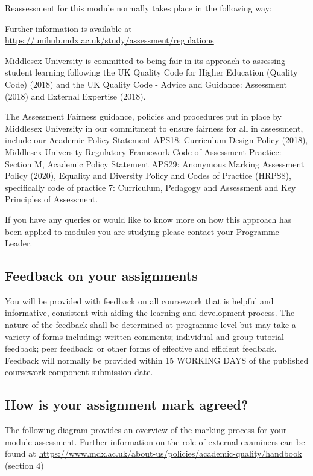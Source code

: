 \documentclass{MDXHandbook}
\begin{document}
Reassessment for this module normally takes place in the following way:

Further information is available at \\ \url{https://unihub.mdx.ac.uk/study/assessment/regulations}

Middlesex University is committed to being fair in its approach to assessing student learning following the UK Quality Code for Higher Education (Quality Code) (2018) and the UK Quality Code - Advice and Guidance: Assessment (2018) and External Expertise (2018).

The Assessment Fairness guidance, policies and procedures put in place by Middlesex University in our commitment to ensure fairness for all in assessment, include our Academic Policy Statement APS18: Curriculum Design Policy (2018), Middlesex University Regulatory Framework Code of Assessment Practice: Section M, Academic Policy Statement APS29: Anonymous Marking Assessment Policy (2020), Equality and Diversity Policy and Codes of Practice (HRPS8), specifically code of practice 7: Curriculum, Pedagogy and Assessment and Key Principles of Assessment. 

If you have any queries or would like to know more on how this approach has been applied to modules you are studying please contact your Programme Leader.

\subsection{Feedback on your assignments}
You will be provided with feedback on all coursework that is helpful and informative, consistent with aiding the learning and development process. The nature of the feedback shall be determined at programme level but may take a variety of forms including: written comments; individual and group tutorial feedback; peer feedback; or other forms of effective and efficient feedback. 
Feedback will normally be provided within 15 WORKING DAYS of the published coursework component submission date.

\subsection{How is your assignment mark agreed?}
The following diagram provides an overview of the marking process for your module assessment. Further information on the role of  external examiners can be found at \url{https://www.mdx.ac.uk/about-us/policies/academic-quality/handbook} (section 4)
\end{document}
